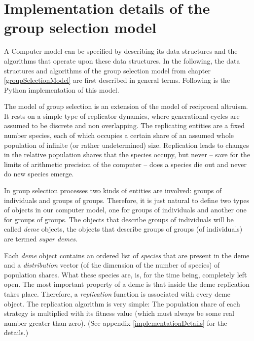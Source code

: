 \newpage
\section{Implementation details of the group selection model}
\label{groupSelectionDetails}

A Computer model can be specified by describing its data structures
and the algorithms that operate upon these data structures. In the following,
the data structures and algorithms of the group selection model from chapter
\ref{groupSelectionModel} are first described in general terms. Following is
the Python implementation of this model.

The model of group selection is an extension of the model of reciprocal
altruism. It rests on a simple type of replicator
dynamics, where generational cycles are assumed to be discrete and non
overlapping. The replicating entities are a fixed number species, each
of which occupies a certain share of an assumed whole population of
infinite (or rather undetermined) size. Replication leads to changes in the
relative population shares that the species occupy, but never -- save for the
limits of arithmetic precision of the computer -- does a species die out and
never do new species emerge.

In group selection processes two
kinds of entities are involved: groups of individuals and groups of
groups. Therefore, it is just natural to define two types of objects
in our computer model, one for groups of individuals and another
one for groups of groups. The objects that describe groups of
individuals will be called {\em deme} objects, the objects that
describe groups of groups (of individuals) are termed {\em super
demes}.

Each {\em deme} object contains an ordered list of {\em species} that are
present in the deme and a {\em distribution} vector (of the dimension of the
number of species) of population shares. What these species are, is, for the
time being, completely left open. The most important property of a deme is
that inside the deme replication takes place. Therefore, a {\em replication}
function is associated with every deme object. The replication algorithm is
very simple: The population share of each strategy is multiplied with its
fitness value (which must always be some real number greater than zero). (See
appendix \ref{implementationDetails} for the details.)


